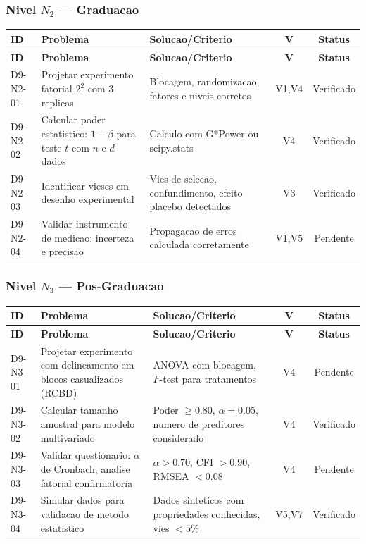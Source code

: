 \subsubsection{Nivel $N_2$ --- Graduacao}

\begin{longtable}{|p{2.0cm}|p{4.2cm}|p{4.2cm}|c|c|}
\hline
\textbf{ID} & \textbf{Problema} & \textbf{Solucao/Criterio} & \textbf{V} & \textbf{Status} \\
\hline
\endfirsthead
\hline
\textbf{ID} & \textbf{Problema} & \textbf{Solucao/Criterio} & \textbf{V} & \textbf{Status} \\
\hline
\endhead
\hline
\endfoot
D9-N2-01 & Projetar experimento fatorial $2^{2}$ com 3 replicas & Blocagem, randomizacao, fatores e niveis corretos & V1,V4 & Verificado \\
\hline
D9-N2-02 & Calcular poder estatistico: $1-\beta$ para teste $t$ com $n$ e $d$ dados & Calculo com G*Power ou scipy.stats & V4 & Verificado \\
\hline
D9-N2-03 & Identificar vieses em desenho experimental & Vies de selecao, confundimento, efeito placebo detectados & V3 & Verificado \\
\hline
D9-N2-04 & Validar instrumento de medicao: incerteza e precisao & Propagacao de erros calculada corretamente & V1,V5 & Pendente \\
\hline
\end{longtable}

\subsubsection{Nivel $N_3$ --- Pos-Graduacao}

\begin{longtable}{|p{2.0cm}|p{4.2cm}|p{4.2cm}|c|c|}
\hline
\textbf{ID} & \textbf{Problema} & \textbf{Solucao/Criterio} & \textbf{V} & \textbf{Status} \\
\hline
\endfirsthead
\hline
\textbf{ID} & \textbf{Problema} & \textbf{Solucao/Criterio} & \textbf{V} & \textbf{Status} \\
\hline
\endhead
\hline
\endfoot
D9-N3-01 & Projetar experimento com delineamento em blocos casualizados (RCBD) & ANOVA com blocagem, $F$-test para tratamentos & V4 & Pendente \\
\hline
D9-N3-02 & Calcular tamanho amostral para modelo multivariado & Poder $\geq 0.80$, $\alpha=0.05$, numero de preditores considerado & V4 & Verificado \\
\hline
D9-N3-03 & Validar questionario: $\alpha$ de Cronbach, analise fatorial confirmatoria & $\alpha>0.70$, CFI $>0.90$, RMSEA $<0.08$ & V4 & Pendente \\
\hline
D9-N3-04 & Simular dados para validacao de metodo estatistico & Dados sinteticos com propriedades conhecidas, vies $<5\%$ & V5,V7 & Verificado \\
\hline
\end{longtable}

